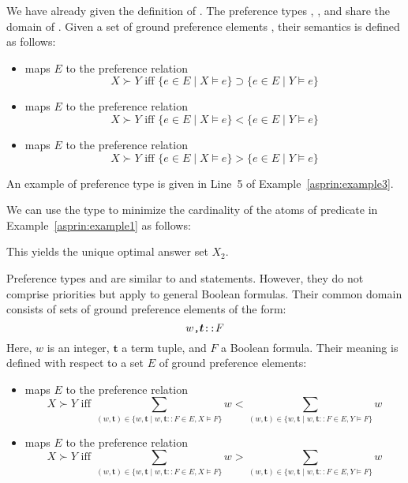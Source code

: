 We have already given the definition of . 
The preference types , , and  share the domain of .
Given a set of ground preference elements ,
their semantics is defined as follows:
\begin{itemize}
\item
{} maps $E$ to the preference relation
\[
X \succ Y \text{ iff } \{e\in E\mid X\models e\}\supset\{e\in E\mid Y\models e\}
\]
\item
{} maps $E$ to the preference relation
\[
X \succ Y \text{ iff } \{e\in E\mid X\models e\}<\{e\in E\mid Y\models e\}
\]
\item
{} maps $E$ to the preference relation
\[
X \succ Y \text{ iff } \{e\in E\mid X\models e\}>\{e\in E\mid Y\models e\}
\]
\end{itemize}
An example of preference type  is given in Line~5 of Example~\ref{asprin:example3}.
%
\begin{example}
%
%
We can use the type  to minimize the cardinality of the atoms of predicate 
in Example~\ref{asprin:example1} as follows:
%

%
This yields the unique optimal answer set $X_2$.
\end{example}

Preference types  and 
are similar to  and  statements.
However, they do not comprise priorities but apply to general Boolean formulas.
Their common domain consists of sets of ground preference elements of the form:
\[w\texttt{,}\boldsymbol{t}\texttt{::}F\]
Here, ${w}$ is an integer, $\boldsymbol{t}$ a term tuple, and $F$ a Boolean formula. 
%
Their meaning is defined with respect to a set $E$ of ground preference elements:
\begin{itemize}
\item
{} maps $E$ to the preference relation
\[
X \succ Y 
\text{ iff }
\sum_{(w,\boldsymbol{t})\in\{w,\boldsymbol{t}\mid w,\boldsymbol{t}\mathtt{::}F\in E, X\models F\}}w
<
\sum_{(w,\boldsymbol{t})\in\{w,\boldsymbol{t}\mid w,\boldsymbol{t}\mathtt{::}F\in E, Y\models F\}}w
\]
\item
{} maps $E$ to the preference relation
\[
X \succ Y 
\text{ iff }
\sum_{(w,\boldsymbol{t})\in\{w,\boldsymbol{t}\mid w,\boldsymbol{t}\mathtt{::}F\in E, X\models F\}}w
>
\sum_{(w,\boldsymbol{t})\in\{w,\boldsymbol{t}\mid w,\boldsymbol{t}\mathtt{::}F\in E, Y\models F\}}w
\]
\end{itemize}


